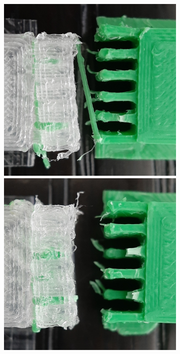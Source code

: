 \begin{figure}
	\setlength{\figwidth}{.19\columnwidth}
	\begin{subfigure}[B]{.99\columnwidth}
		\centering
		\includegraphics[width=\figwidth]{sources/testing/j1_cropped.jpg}
		\includegraphics[width=\figwidth]{sources/testing/j2_cropped.jpg}

\end{subfigure}
\end{figure}
